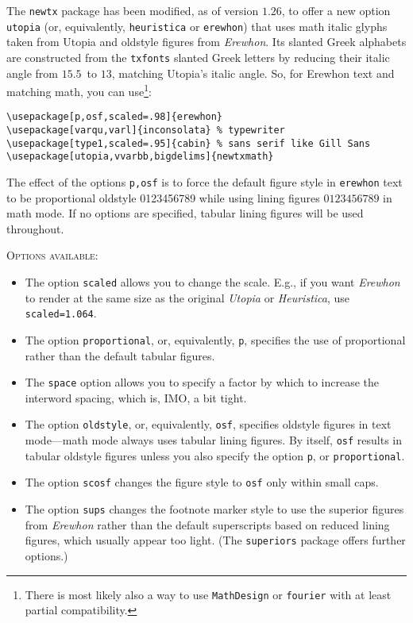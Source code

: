 \documentclass[11pt]{amsart}
\begin{document}
The {\tt newtx} package has been modified, as of version $1.26$,  to offer a new option {\tt utopia} (or, equivalently, {\tt heuristica} or {\tt erewhon}) that uses math italic glyphs taken from Utopia and oldstyle figures from \emph{Erewhon}. Its slanted Greek alphabets are constructed from the {\tt txfonts} slanted Greek letters by reducing their italic angle from $15.5$\textdegree\ to $13$\textdegree, matching Utopia's italic angle. So, for Erewhon text and matching math, you can use\footnote{There is most likely also a way to use {\tt MathDesign} or {\tt fourier} with at least partial compatibility.}:
\begin{verbatim}
\usepackage[p,osf,scaled=.98]{erewhon}
\usepackage[varqu,varl]{inconsolata} % typewriter
\usepackage[type1,scaled=.95]{cabin} % sans serif like Gill Sans
\usepackage[utopia,vvarbb,bigdelims]{newtxmath}
\end{verbatim}
The effect of the options {\tt p,osf} is to force the default figure style in {\tt erewhon} text to be proportional oldstyle 0123456789 while using lining figures $0123456789$ in math mode. If no options are specified, tabular lining figures will be used throughout.

\textsc{Options available:}
\begin{itemize}
\item The option {\tt scaled} allows you to change the scale. E.g., if you want \emph{Erewhon} to render at the same size as the original \emph{Utopia} or \emph{Heuristica}, use {\tt scaled=1.064}.
\item
The option {\tt proportional}, or, equivalently, {\tt p}, specifies the use of proportional rather than the default tabular figures.
\item
 The {\tt space} option allows you to specify a factor by which to increase the interword spacing, which is, IMO, a bit tight.
\item
The option {\tt oldstyle}, or, equivalently, {\tt osf}, specifies oldstyle figures in text mode---math mode always uses tabular lining figures. By itself, {\tt osf} results in tabular oldstyle figures unless you also specify the option {\tt p}, or {\tt proportional}.
\item The option {\tt scosf} changes the figure style to {\tt osf} only within small caps. 
\item
 The option {\tt sups}  changes the footnote marker style to use the superior figures from \emph{Erewhon} rather than the default  superscripts based on reduced lining figures, which usually appear too light. (The {\tt superiors} package offers further options.)
\end{itemize}
\end{document}
